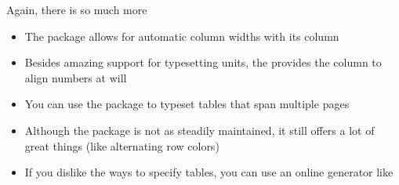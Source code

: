 \savebox{}
\begin{frame}{Again, there is so much more}
   \begin{itemize}
      \itemsep8pt
      \item The  package allows for automatic column widths with its  column
      \item Besides amazing support for typesetting units, the  provides the  column to align numbers at will
      \item You can use the  package to typeset tables that span multiple pages
      \item Although the  package is not as steadily maintained, it still offers a lot of great things (like alternating row colors)
      \item If you dislike the ways to specify tables, you can use an online generator like 
   \end{itemize}
\end{frame}